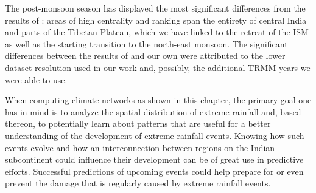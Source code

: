 The post-monsoon season has displayed the most significant differences from the results of \citet{Stolbova.2015}: areas of high centrality and ranking span the entirety of central India and parts of the Tibetan Plateau, which we have linked to the retreat of the ISM as well as the starting transition to the north-east monsoon. The significant differences between the results of \citet{Stolbova.2015} and our own were attributed to the lower dataset resolution used in our work and, possibly, the additional TRMM years we were able to use.

When computing climate networks as shown in this chapter, the primary goal one has in mind is to analyze the spatial distribution of extreme rainfall and, based thereon, to potentially learn about patterns that are useful for a better understanding of the development of extreme rainfall events. Knowing how such events evolve and how an interconnection between regions on the Indian subcontinent could influence their development can be of great use in predictive efforts. Successful predictions of upcoming events could help prepare for or even prevent the damage that is regularly caused by extreme rainfall events.

